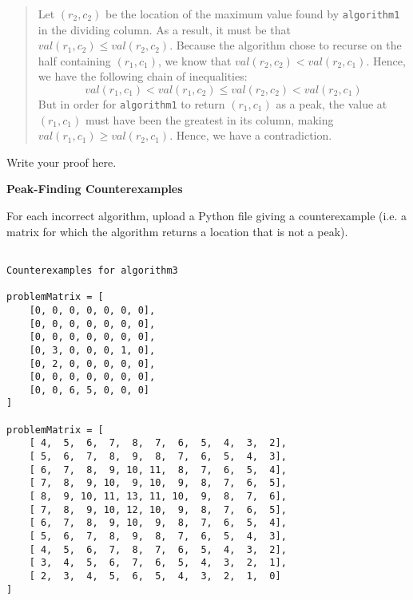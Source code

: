 \documentclass[12pt,twoside]{article}
\begin{document}
\begin{problems}
\begin{quote}
Let $(r_2, c_2)$ be
the location of the maximum value found by \texttt{algorithm1}
in the dividing column.
As a result, it must be that $val(r_1, c_2) \le val(r_2, c_2)$.
Because the algorithm chose to recurse
on the half containing $(r_1, c_1)$,
we know that $val(r_2, c_2) < val(r_2, c_1)$.
Hence, we have the following chain of inequalities:
$$val(r_1, c_1) < val(r_1, c_2) \le val(r_2, c_2) < val(r_2, c_1)$$
But in order for \texttt{algorithm1} to return $(r_1, c_1)$ as a peak,
the value at $(r_1, c_1)$ must have been the greatest in its column,
making $val(r_1, c_1) \ge val(r_2, c_1)$.
Hence, we have a contradiction.
\end{quote}

\ifsolution \solution{}
Write your proof here.
\fi

\problem {} \textbf{Peak-Finding Counterexamples}

For each incorrect algorithm,
upload a Python file giving a counterexample
(i.e. a matrix for which the algorithm returns a location
that is not a peak).

\ifsolution \solution{}
\begin{verbatim}

Counterexamples for algorithm3

problemMatrix = [
    [0, 0, 0, 0, 0, 0, 0],
    [0, 0, 0, 0, 0, 0, 0],
    [0, 0, 0, 0, 0, 0, 0],
    [0, 3, 0, 0, 0, 1, 0],
    [0, 2, 0, 0, 0, 0, 0],
    [0, 0, 0, 0, 0, 0, 0],
    [0, 0, 6, 5, 0, 0, 0]
]

problemMatrix = [
	[ 4,  5,  6,  7,  8,  7,  6,  5,  4,  3,  2],
	[ 5,  6,  7,  8,  9,  8,  7,  6,  5,  4,  3],
	[ 6,  7,  8,  9, 10, 11,  8,  7,  6,  5,  4],
	[ 7,  8,  9, 10,  9, 10,  9,  8,  7,  6,  5],
	[ 8,  9, 10, 11, 13, 11, 10,  9,  8,  7,  6],
	[ 7,  8,  9, 10, 12, 10,  9,  8,  7,  6,  5],
	[ 6,  7,  8,  9, 10,  9,  8,  7,  6,  5,  4],
	[ 5,  6,  7,  8,  9,  8,  7,  6,  5,  4,  3],
	[ 4,  5,  6,  7,  8,  7,  6,  5,  4,  3,  2],
	[ 3,  4,  5,  6,  7,  6,  5,  4,  3,  2,  1],
	[ 2,  3,  4,  5,  6,  5,  4,  3,  2,  1,  0]
]

\end{verbatim}
\fi

\end{problems}
\end{document}
